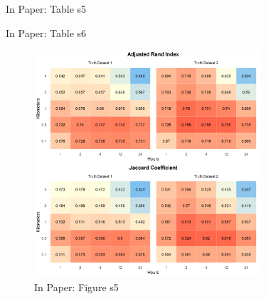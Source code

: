 \documentclass[9pt]{article}
\begin{document}
\begin{table}[H]
\caption{In Paper: Table s5}
\centering

\end{table}

\begin{table}[H]
\caption{In Paper: Table s6}
\centering

\end{table}

\begin{figure}[H]
\centering
\includegraphics[width=0.75\textwidth]{figures/figure_s5.png}
\caption{In Paper: Figure s5}
\end{figure}
\end{document}
